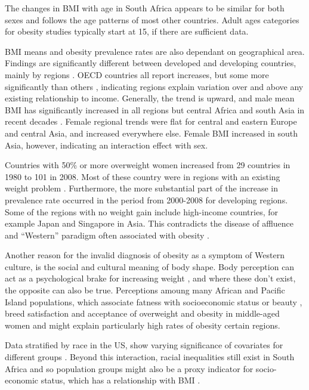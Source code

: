 \documentclass[12pt,a4paper]{article}
\begin{document}
The changes in BMI with age in South Africa appears to be similar for both sexes \citep{bradshaw} and follows the age patterns of most other countries. Adult ages categories for obesity studies typically start at 15, if there are sufficient data. 

BMI means and obesity prevalence rates are also dependant on geographical area. Findings are significantly different between developed and developing countries, mainly by regions \citep{stevens11, stevens12}. OECD countries all report increases, but some more significantly than others \citep{oecd}, indicating regions explain variation over and above any existing relationship to income. Generally, the trend is upward, and male mean BMI has significantly increased in all regions but central Africa and south Asia in recent decades \citep{stevens11}. Female regional trends were flat for central and eastern Europe and central Asia, and increased everywhere else. Female BMI increased in south Asia, however, indicating an interaction effect with sex.

Countries with 50\% or more overweight women increased from 29 countries in 1980 to 101 in 2008. Most of these country were in regions with an existing weight problem \citep{stevens12}. Furthermore, the more substantial part of the increase in prevalence rate occurred in the period from 2000-2008 for developing regions. Some of the regions with no weight gain include high-income countries, for example Japan and Singapore in Asia. This contradicts the disease of affluence and ``Western'' paradigm often associated with obesity \citep{haslam05, prentice06}.

Another reason for the invalid diagnosis of obesity as a symptom of Western culture, is the social and cultural meaning of body shape. Body perception can act as a psychological brake for increasing weight \citep{prentice06}, and where these don't exist, the opposite can also be true. Perceptions amoung many African and Pacific Island populations, which associate fatness with socioeconomic status or beauty \citep{kopelman2000}, breed satisfaction and acceptance of overweight and obesity in middle-aged women and might explain particularly high rates of obesity certain regions.

Data stratified by race in the US, show varying significance of covariates for different groups \citep{ladabaum2014}. Beyond this interaction, racial inequalities still exist in South Africa and so population groups might also be a proxy indicator for socio-economic status, which has a relationship with BMI \citep{ezzati02}. 
\end{document}

